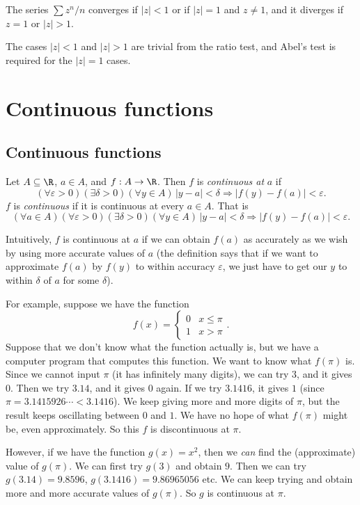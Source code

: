 \documentclass[a4paper]{article}
\begin{document}
\begin{eg}
  The series $\sum z^n/n$ converges if $|z| < 1$ or if $|z| = 1$ and $z \not= 1$, and it diverges if $z = 1$ or $|z| > 1$.

  The cases $|z| < 1$ and $|z| > 1$ are trivial from the ratio test, and Abel's test is required for the $|z| = 1$ cases.
\end{eg}
\section{Continuous functions}
\subsection{Continuous functions}
\begin{defi}
  Let $A\subseteq \R$, $a\in A$, and $f: A\to \R$. Then $f$ is \emph{continuous at} $a$ if
  \[
    (\forall \varepsilon > 0)(\exists \delta > 0)(\forall y\in A)\, |y - a| < \delta \Rightarrow |f(y) - f(a)| < \varepsilon.
  \]
  $f$ is \emph{continuous} if it is continuous at every $a\in A$. That is
  \[
    (\forall a\in A)(\forall \varepsilon > 0)(\exists \delta > 0)(\forall y\in A)\, |y - a| < \delta \Rightarrow |f(y) - f(a)| < \varepsilon.
  \]
\end{defi}
Intuitively, $f$ is continuous at $a$ if we can obtain $f(a)$ as accurately as we wish by using more accurate values of $a$ (the definition says that if we want to approximate $f(a)$ by $f(y)$ to within accuracy $\varepsilon$, we just have to get our $y$ to within $\delta$ of $a$ for some $\delta$).

For example, suppose we have the function
\[
  f(x) = \begin{cases} 0 & x \leq \pi\\ 1& x > \pi\end{cases}.
\]
Suppose that we don't know what the function actually is, but we have a computer program that computes this function. We want to know what $f(\pi)$ is. Since we cannot input $\pi$ (it has infinitely many digits), we can try $3$, and it gives $0$. Then we try $3.14$, and it gives $0$ again. If we try $3.1416$, it gives $1$ (since $\pi = 3.1415926\cdots < 3.1416$). We keep giving more and more digits of $\pi$, but the result keeps oscillating between $0$ and $1$. We have no hope of what $f(\pi)$ might be, even approximately. So this $f$ is discontinuous at $\pi$.

However, if we have the function $g(x) = x^2$, then we \emph{can} find the (approximate) value of $g(\pi)$. We can first try $g(3)$ and obtain $9$. Then we can try $g(3.14) = 9.8596$, $g(3.1416) = 9.86965056$ etc. We can keep trying and obtain more and more accurate values of $g(\pi)$. So $g$ is continuous at $\pi$.
\end{document}
